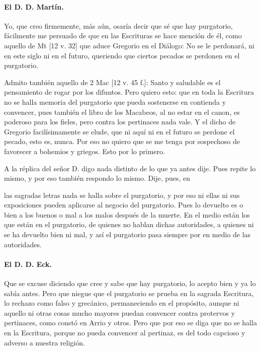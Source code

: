 \paragraph*{El D. D. Martín.}

Yo, que creo firmemente, más aún, osaría decir que sé que hay purgatorio, fácilmente me persuado de que en las Escrituras se hace mención de él, como aquello de Mt [12 v. 32] que aduce Gregorio en el Diálogo: No se le perdonará, ni en este siglo ni en el futuro, queriendo que ciertos pecados se perdonen en el purgatorio.

Admito también aquello de 2 Mac [12 v. 45 f.]: Santo y saludable es el pensamiento de rogar por los difuntos. Pero quiero esto: que en toda la Escritura no se halla memoria del purgatorio que pueda sostenerse en contienda y convencer, pues también el libro de los Macabeos, al no estar en el canon, es poderoso para los fieles, pero contra los pertinaces nada vale. Y el dicho de Gregorio facilísimamente se elude, que ni aquí ni en el futuro se perdone el pecado, esto es, nunca. Por eso no quiero que se me tenga por sospechoso de favorecer a bohemios y griegos. Esto por lo primero.

A la réplica del señor D. digo nada distinto de lo que ya antes dije. Pues repite lo mismo, y por eso también respondo lo mismo. Dije, pues, en

las sagradas letras nada se halla sobre el purgatorio, y por eso ni ellas ni sus exposiciones pueden aplicarse al negocio del purgatorio. Pues lo devuelto es o bien a los buenos o mal a los malos después de la muerte. En el medio están los que están en el purgatorio, de quienes no hablan dichas autoridades, a quienes ni se ha devuelto bien ni mal, y así el purgatorio pasa siempre por en medio de las autoridades.

\paragraph*{El D. D. Eck.}

Que se excuse diciendo que cree y sabe que hay purgatorio, lo acepto bien y ya lo sabía antes. Pero que niegue que el purgatorio se prueba en la sagrada Escritura, lo rechazo como falso y grecánico, permaneciendo en el propósito, aunque ni aquello ni otras cosas mucho mayores puedan convencer contra protervos y pertinaces, como constó en Arrio y otros. Pero que por eso se diga que no se halla en la Escritura, porque no pueda convencer al pertinaz, es del todo capcioso y adverso a nuestra religión.


